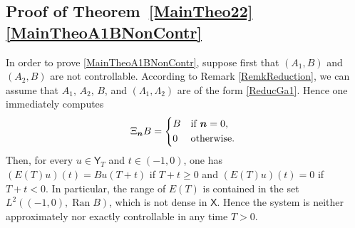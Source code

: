 \documentclass[10pt]{amsart}
\newcommand{\bn}{\boldsymbol{n}}
\theoremstyle{plain}
\theoremstyle{definition}
\DeclareMathOperator{\range}{Ran}
\begin{document}
\subsection{Proof of Theorem~\ref{MainTheo22}\eqref{MainTheoA1BNonContr}}

In order to prove \eqref{MainTheoA1BNonContr}, suppose first that $(A_1, B)$ and $(A_2, B)$ are not controllable. According to Remark \ref{RemkReduction}, we can assume that $A_1$, $A_2$, $B$, and $(\Lambda_1, \Lambda_2)$ are of the form \eqref{ReducGa1}. Hence one immediately computes
\[
\Xi_{\bn} B =
\begin{dcases*}
B & if $\bn = 0$, \\
0 & otherwise.
\end{dcases*}
\]
Then, for every $u \in \mathsf Y_T$ and $t \in (-1, 0)$, one has $(E(T) u)(t) = B u(T + t)$ if $T + t \geq 0$ and $(E(T) u)(t) = 0$ if $T + t < 0$. In particular, the range of $E(T)$ is contained in the set $L^2((-1, 0), \range B)$, which is not dense in $\mathsf X$. Hence the system is neither approximately nor exactly controllable in any time $T > 0$.
\end{document}
